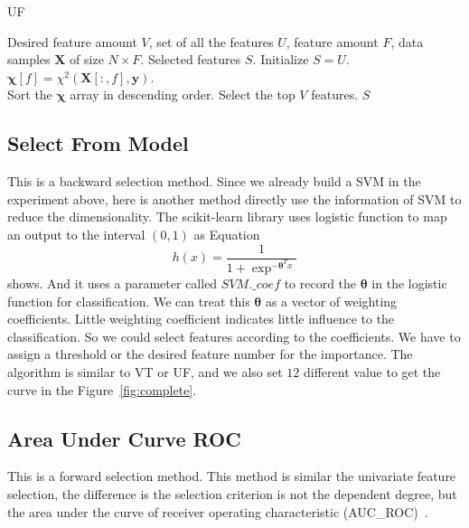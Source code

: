 \documentclass{article}
\newcommand{\Xmat}{{\boldsymbol X}}
\newcommand{\yv}{\boldsymbol{y}}
\newcommand{\thetav}{\boldsymbol{\theta}}
\newcommand{\chiv}[0]{{\boldsymbol{\chi}} }
\begin{document}
\begin{algorithm}
	\caption{UF}
	\label{alg:uf}
	\begin{algorithmic}[1]
		\REQUIRE Desired feature amount $V$, set of all the features $U$, feature amount $F$, data samples $\Xmat$ of size $N\times F$.
		\ENSURE Selected features $S$.
		\STATE Initialize $S=U$.
			\STATE $\chiv[f] = \chi^2(\Xmat[:,f],\yv)$.
		\ENDFOR\\
		\STATE Sort the $\chiv$ array in descending order.
		\STATE Select the top $V$ features.
		\RETURN $S$
	\end{algorithmic}
\end{algorithm}

\subsection{Select From Model}
This is a backward selection method. Since we already build a SVM in the experiment above, here is another method directly use the information of SVM to reduce the dimensionality. The scikit-learn library uses logistic function to map an output to the interval $(0,1)$ as Equation
\begin{equation}
	\label{eq:coef}
	h(x) = \frac{1}{1+\exp^{-\thetav^Tx}}
\end{equation}
shows. And it uses a parameter called $SVM.\_coef$ to record the $\thetav$ in the logistic function for classification. We can treat this $\thetav$ as a vector of weighting coefficients. Little weighting coefficient indicates little influence to the classification. So we could select features according to the coefficients. We have to assign a threshold or the desired feature number for the importance. The algorithm is similar to VT or UF, and we also set $12$ different value to get the curve in the Figure~\ref{fig:complete}.


\subsection{Area Under Curve ROC}
This is a forward selection method. This method is similar the univariate feature selection, the difference is the selection criterion is not the dependent degree, but the area under the curve of receiver operating characteristic (AUC\_ROC)~\cite{ROC}. 
\end{document}
